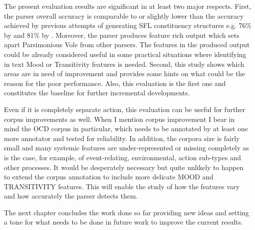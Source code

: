     The present evaluation results are significant in at least two major respects. First, the parser overall accuracy is comparable to or slightly lower than the accuracy achieved by previous attempts of generating SFL constituency structures e.g. 76\% by \citet{Souter1996} and 81\% by \citet{ODonoghue91}.
    Moreover, the parser produces feature rich output which sets apart Parsimonious Vole from other parsers. The features in the produced output could be already considered useful in some practical situations where identifying in text Mood or Transitivity features is needed. 
    Second, this study shows which areas are in need of improvement and provides some hints on what could be the reason for the poor performance. Also, this evaluation is the first one and constitutes the baseline for further incremental developments.
    
    Even if it is completely separate action, this evaluation can be useful for further corpus improvements as well. When I mention corpus improvement I bear in mind the OCD corpus in particular, which needs to be annotated by at least one more annotator and tested for reliability. In addition, the corpora size is fairly small and many systemic features are under-represented or missing completely as is the case, for example, of event-relating, environmental, action sub-types and other processes. It would be desperately necessary but quite unlikely to happen \citep[33]{mcenery2006corpus} to extend the corpus annotation to include more delicate MOOD and TRANSITIVITY features. This will enable the study of how the features vary and how accurately the parser detects them. 
    
    The next chapter concludes the work done so far providing new ideas and setting a tone for what needs to be done in future work to improve the current results.